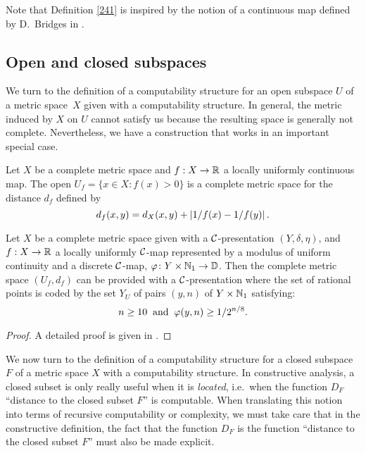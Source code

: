 Note that Definition \ref{241} is inspired by the notion of a continuous map defined by D.~Bridges in  \cite[Constructive functional analysis]{Br}.

\subsection {Open and closed subspaces} \label{subsec25}

We turn to the definition of a computability structure for an open subspace $U$ of a metric space~$X$ given with a computability structure. In general, the metric induced by $X$ on $U$ cannot satisfy us because the resulting space is generally not complete. Nevertheless, we have a construction that works in an important special case.

Let $X$ be a complete metric space and $f: X \to \mathbb {R}$ a locally uniformly continuous map. The open $U_f = \{x \in X: f(x) > 0 \}$ is a complete metric space for the distance $d_f$ defined by 
\[
d_f(x,y) = d_X(x,y) + \left|{1/f(x) - 1/f(y)}\right|.
\]

\begin{propdef} \label{251}
Let $X$ be a complete metric space given with a ${{\cal C}}$-presentation $(Y, \delta, \eta)$, and $f: X \to \mathbb {R}$ a locally uniformly  ${{\cal C}}$-map represented by a modulus of uniform continuity and a discrete ${{\cal C}}$-map,
$ \varphi\colon Y \times \mathbb {N}_1 \to \mathbb {D}$. Then the complete metric space $(U_f, d_f)$ can be provided with a ${{\cal C}}$-presentation where the set of rational points is coded by the set $Y_U$ of pairs $(y,n)$ of $Y \times \mathbb {N}_1$ satisfying: 
\[
n \geq 10 \; \; {\rm and} \; \; \varphi(y,n) \geq 1/2^{n/8}.
\]
\end{propdef}
\begin{proof} A detailed proof is given in \cite{Mo}. 
\end{proof}


We now turn to the definition of a computability structure for a closed subspace $F$ of a metric space $X$ with a computability structure. In constructive analysis, a closed subset is only really useful when it is \emph{located}, i.e.\ when the function $D_F$ ``distance to the closed subset $F$'' is computable. When translating this notion into terms of recursive computability or complexity, we must take care that in the constructive definition, the fact that the function $D_F$ is the function ``distance to the closed subset $F$'' must also be made explicit.

